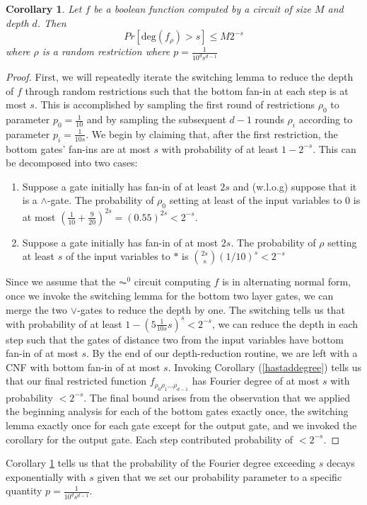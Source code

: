 \documentclass{amsart}
\newtheorem{corollary}{Corollary}[theorem]
\theoremstyle{definition}
\theoremstyle{remark}
\numberwithin{equation}{section}
\theoremstyle{remark}
\begin{document}
\begin{corollary} \label{fouriertail}
  Let $f$ be a boolean function computed by a circuit of size $M$ and depth $d$. Then
  $$ Pr[\text{deg}(f_{\rho}) > s] \leq M2^{-s} $$
  where $\rho$ is a random restriction where $p = \frac{1}{10^ds^{d-1}}$
\end{corollary}
%
\begin{proof}
   First, we will repeatedly iterate the switching lemma to reduce the depth of $f$ through random restrictions such that the bottom fan-in at each step is at most $s$. This is accomplished by sampling the first round of restrictions $\rho_0$ to parameter $p_0 = \frac{1}{10}$ and by sampling the subsequent $d-1$ rounds $\rho_i$ according to parameter $p_i = \frac{1}{10s}$. We begin by claiming that, after the first restriction, the bottom gates' fan-ins are at most $s$ with probability of at least $1 - 2^{-s}$. This can be decomposed into two cases:
   \begin{enumerate}
     \item Suppose a gate initially has fan-in of at least $2s$ and (w.l.o.g) suppose that it is a $\wedge$-gate. The probability of $\rho_0$ setting at least of the input variables to $0$ is at most $(\frac{1}{10} + \frac{9}{20})^{2s} = (0.55)^{2s} < 2^{-s}$.
     \item Suppose a gate initially has fan-in of at most $2s$. The probability of $\rho$ setting at least $s$ of the input variables to $*$ is ${2s \choose s}(1/10)^s < 2^{-s}$
   \end{enumerate}
  Since we assume that the $\AC^0$ circuit computing $f$ is in alternating normal form, once we invoke the switching lemma for the bottom two layer gates, we can merge the two $\vee$-gates to reduce the depth by one. The switching tells us that with probability of at least $1 - (5\frac{1}{10s}s)^s < 2^{-s}$, we can reduce the depth in each step such that the gates of distance two from the input variables have bottom fan-in of at most $s$. By the end of our depth-reduction routine, we are left with a CNF with bottom fan-in of at most $s$. Invoking Corollary (\ref{hastaddegree}) tells us that our final restricted function $f_{\rho_0\rho_1...\rho_{d-1}}$ has Fourier degree of at most $s$ with probability $< 2^{-s}$. The final bound arises from the observation that we applied the beginning analysis for each of the bottom gates exactly once, the switching lemma exactly once for each gate except for the output gate, and we invoked the corollary for the output gate. Each step contributed probability of $< 2^{-s}$.
\end{proof}
%
Corollary \ref{fouriertail} tells us that the probability of the Fourier degree exceeding $s$ decays exponentially with $s$ given that we set our probability parameter to a specific quantity $p = \frac{1}{10^ds^{d-1}}$.
\end{document}
